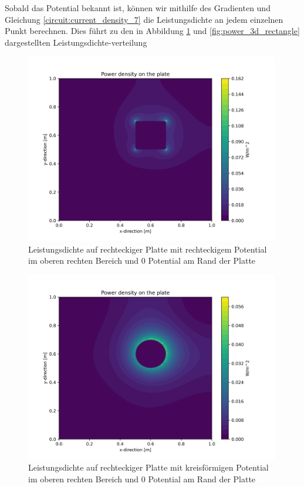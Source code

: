 Sobald das Potential bekannt ist, können wir mithilfe des Gradienten und Gleichung \eqref{circuit:current_density_7} die Leistungsdichte an jedem einzelnen Punkt berechnen. Dies führt zu den in Abbildung \ref{fig:power_2d} und \ref{fig:power_3d_rectangle} dargestellten Leistungsdichte-verteilung \cite{github:AndreasFMueller}
\begin{figure}[h]
	\centering
	\includegraphics[width=0.99\textwidth]{papers/circuit/power_distribution.png}
	\caption{Leistungsdichte auf rechteckiger Platte mit rechteckigem Potential im oberen rechten Bereich und 0 Potential am Rand der Platte \cite{github:AndreasFMueller}}
	\label{fig:power_2d}
\end{figure}
\begin{figure}[h]
	\centering
	\includegraphics[width=0.99\textwidth]{papers/circuit/power_distribution_circle.png}
	\caption{Leistungsdichte auf rechteckiger Platte mit kreisförmigen Potential im oberen rechten Bereich und 0 Potential am Rand der Platte \cite{github:AndreasFMueller}}
	\label{fig:power_2d_circle}
\end{figure}
